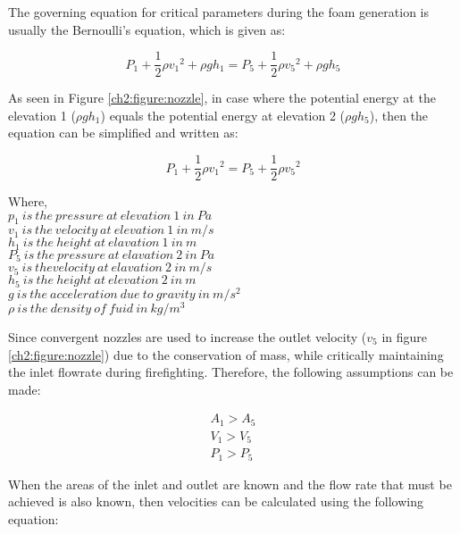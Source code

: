 The governing equation for critical parameters during the foam generation is usually the Bernoulli's equation, which is given as:

\begin{equation}
    P_1+\frac{1}{2}\rho{v_1}^2 + \rho gh_1 = P_5+\frac{1}{2}\rho{v_5}^2 + \rho gh_5
\end{equation}

As seen in Figure \ref{ch2:figure:nozzle}, in case where the potential energy at the elevation 1 ($\rho gh_1$) equals the potential energy at elevation 2 ($\rho gh_5$), then the equation can be simplified and written as:

\begin{equation}
    P_1+\frac{1}{2}\rho{v_1}^2 = P_5+\frac{1}{2}\rho{v_5}^2
\end{equation}

\begin{doublespace}
    Where, \\
    $p_1\ is\ the\ pressure\ at\ elevation\ 1\ in\ Pa$ \\
    $v_1\ is\ the\ velocity\ at\ elevation\ 1\ in\ m/s$ \\
    $h_1\ is\ the\ height\ at\ elavation\ 1\ in\ m$ \\
    $P_5\ is\ the\ pressure\ at\ elavation\ 2\ in\ Pa$ \\
    $v_5\ is\ the velocity\ at\ elavation\ 2\ in\ m/s$ \\
    $h_5\ is\ the\ height\ at\ elevation\ 2\ in\ m$ \\
    $g\ is\ the\ acceleration\ due\ to\ gravity\ in\ m/s^2$ \\
    $\rho\ is\ the\ density\ of\ fuid\ in\ kg/m^3$ \\
\end{doublespace}

Since convergent nozzles are used to increase the outlet velocity ($v_5$  in figure \ref{ch2:figure:nozzle}) due to the conservation of mass, while critically maintaining the inlet flowrate during firefighting. Therefore, the following assumptions can be made:

\begin{gather*}
    A_1 > A_5 \\
    V_1 > V_5 \\
    P_1 > P_5
\end{gather*}

When the areas of the inlet and outlet are known and the flow rate that must be achieved is also known, then velocities can be calculated using the following equation:

